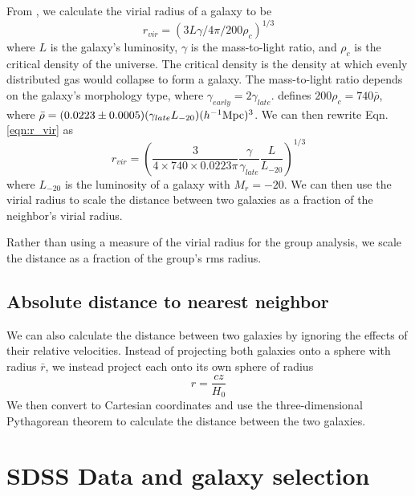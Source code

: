 From \cite{Hwang10}, we calculate the virial radius of a galaxy to be
\begin{equation}\label{eqn:r_vir}
    r_{vir} = (3L\gamma/4\pi/200\rho_c)^{1/3}
\end{equation}
where $L$ is the galaxy's luminosity, $\gamma$ is the mass-to-light ratio, and 
$\rho_c$ is the critical density of the universe.  The critical density is the 
density at which evenly distributed gas would collapse to form a galaxy.  The 
mass-to-light ratio depends on the galaxy's morphology type, where 
$\gamma_{early} = 2\gamma_{late}$.  \cite{Hwang10} defines 
$200\rho_c = 740\bar{\rho}$, where 
$\bar{\rho} = (0.0223\pm 0.0005)(\gamma_{late}L_{-20})(\text{$h^{-1}$Mpc})^3$.  We can 
then rewrite Eqn. \ref{eqn:r_vir} as
\begin{equation}
    r_{vir} = \left( \frac{3}{4\times 740\times 0.0223\pi} \frac{\gamma}{\gamma_{late}} \frac{L}{L_{-20}} \right)^{1/3}
\end{equation}
where $L_{-20}$ is the luminosity of a galaxy with $M_r = -20$.  We can then use 
the virial radius to scale the distance between two galaxies as a fraction of 
the neighbor's virial radius.

Rather than using a measure of the virial radius for the group analysis, we 
scale the distance as a fraction of the group's rms radius.


\subsection{Absolute distance to nearest neighbor}

We can also calculate the distance between two galaxies by ignoring the effects 
of their relative velocities.  Instead of projecting both galaxies onto a sphere 
with radius $\bar{r}$, we instead project each onto its own sphere of radius 
\begin{equation}
    r = \frac{cz}{H_0}
\end{equation}
We then convert to Cartesian coordinates and use the three-dimensional 
Pythagorean theorem to calculate the distance between the two galaxies.




\section[Data]{SDSS Data and galaxy selection}

